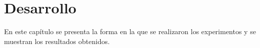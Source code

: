 \chapter{Desarrollo}
\label{Desarrollo}


En este capítulo se presenta la forma en la que se realizaron los experimentos y se muestran los resultados obtenidos. 

